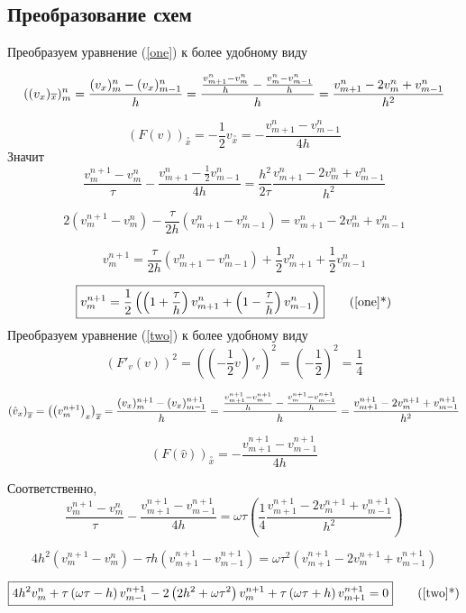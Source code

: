 \subsection{Преобразование схем}
Преобразуем уравнение (\ref{one}) к более удобному виду

\[
((v_x)_{\overline{x}})_m^n = \frac{(v_x)_{m}^n - (v_x)_{m-1}^n}{h} = \frac{\frac{v_{m+1}^n - v_{m}^n}{h} - \frac{v_{m}^n - v_{m-1}^n}{h}}{h} = \frac{v_{m+1}^n - 2v_{m}^n + v_{m-1}^n}{h^2} 
\]

\[
(F(v))_{ \overset{\circ}{x}} = 
-\frac{1}{2}v_{ \overset{\circ}{x} } =
-\frac{ v_{m+1}^n - v_{m-1}^n}{4h}
\]
Значит
\[
\frac{v_{m}^{n+1} - v_m^n}{\tau} -  \frac{v_{m+1}^n - \frac{1}{2} v_{m-1}^n}{4h} = \frac{h^2}{2\tau} \frac{v_{m+1}^n - 2v_{m}^n + v_{m-1}^n}{h^2} 
\]

\[
2 \left( v_{m}^{n+1} - v_m^n \right) -  \frac{\tau}{2h} \left(v_{m+1}^n -  v_{m-1}^n \right) = v_{m+1}^n - 2v_{m}^n + v_{m-1}^n
\]


\[
 v_{m}^{n+1}  =  \frac{\tau}{2h} \left(v_{m+1}^n -  v_{m-1}^n \right) + \frac{1}{2}v_{m+1}^n  + \frac{1}{2}v_{m-1}^n
\]

\begin{align}\label{one1}
\boxed{
v_{m}^{n+1}  = \frac{1}{2}\left( \left(1 + \frac{\tau}{h}\right) v_{m+1}^n  + \left(1 - \frac{\tau}{h}\right) v_{m-1}^n \right)
}
\tag{\ref{one}*}
\end{align}
Преобразуем уравнение (\ref{two}) к более удобному виду
\[
\left(F'_v(v)\right)^2 = \left(\left(-\frac{1}{2}v\right)'_v \right)^2 = \left(-\frac{1}{2}\right)^2 =\frac{1}{4}	
\]

\[
\left(\hat{v}_x\right)_{\overline{x}} = 
\left(\left(v_{m}^{n+1}\right)_x\right)_{\overline{x}} = 
\frac{(v_x)_{m}^{n+1} - (v_x)_{m-1}^{n+1}}{h} =  
\frac{\frac{v_{m+1}^{n+1} - v_{m}^{n+1}}{h}-\frac{v_{m}^{n+1} - v_{m-1}^{n+1}}{h}}{h} =
\frac{v_{m+1}^{n+1} - 2v_{m}^{n+1} + v_{m-1}^{n+1}}{h^2}
\]

\[
(F(\hat{v}))_{ \overset{\circ}{x} } = 
-  \frac{v_{m+1}^{n+1} - v_{m-1}^{n+1}}{4h}
\]

Соответственно,
\[
\frac{v_{m}^{n+1} - v_m^n}{\tau} - \frac{v_{m+1}^{n+1} - v_{m-1}^{n+1}}{4h} = \omega \tau \left( \frac{1}{4} 
\frac{v_{m+1}^{n+1} - 2v_{m}^{n+1} + v_{m-1}^{n+1}}{h^2} \right)
\]

\[
4h^2\left( v_{m}^{n+1} - v_m^n \right)- \tau h \left(v_{m+1}^{n+1} - v_{m-1}^{n+1}\right)= \omega \tau^2 \left(v_{m+1}^{n+1} - 2v_{m}^{n+1} + v_{m-1}^{n+1} \right)
\]

\begin{align}\label{two1}
\boxed{
4h^2 v_m^n + \tau
\left(\omega \tau -h \right) v_{m-1}^{n+1} -
2\left(2h^2 + \omega \tau^2\right) v_{m}^{n+1} +
\tau \left( \omega \tau + h \right) v_{m+1}^{n+1}= 0
}
 \tag{\ref{two}*}
\end{align}

